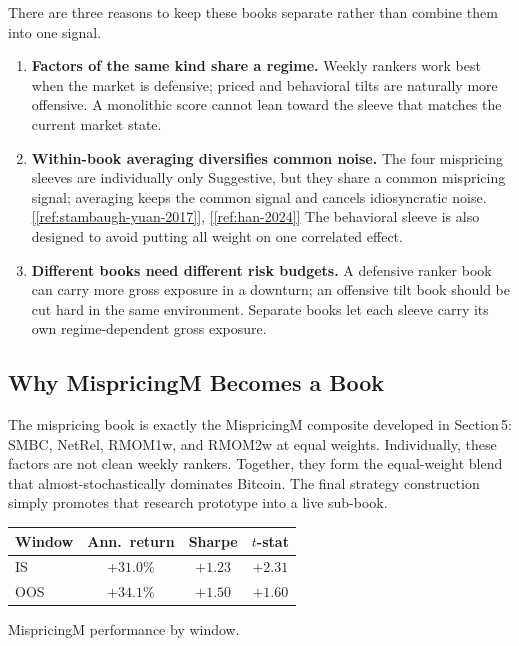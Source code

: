 \documentclass[11pt,a4paper]{article}
\newcommand{\ieeecitetwo}[2]{\hyperref[ref:#1]{[\ref*{ref:#1}]}, \hyperref[ref:#2]{[\ref*{ref:#2}]}}
\begin{document}
There are three reasons to keep these books separate rather than combine them into one signal.

\begin{enumerate}[nosep]
  \item \textbf{Factors of the same kind share a regime.} Weekly rankers work best when the market is defensive; priced and behavioral tilts are naturally more offensive. A monolithic score cannot lean toward the sleeve that matches the current market state.
  \item \textbf{Within-book averaging diversifies common noise.} The four mispricing sleeves are individually only Suggestive, but they share a common mispricing signal; averaging keeps the common signal and cancels idiosyncratic noise.\ieeecitetwo{stambaugh-yuan-2017}{han-2024} The behavioral sleeve is also designed to avoid putting all weight on one correlated effect.
  \item \textbf{Different books need different risk budgets.} A defensive ranker book can carry more gross exposure in a downturn; an offensive tilt book should be cut hard in the same environment. Separate books let each sleeve carry its own regime-dependent gross exposure.
\end{enumerate}

\subsection{Why MispricingM Becomes a Book}

The mispricing book is exactly the MispricingM composite developed in Section\,5: SMBC, NetRel, RMOM1w, and RMOM2w at equal weights. Individually, these factors are not clean weekly rankers. Together, they form the equal-weight blend that almost-stochastically dominates Bitcoin. The final strategy construction simply promotes that research prototype into a live sub-book.

\begin{center}
\small
\begin{tabular}{lccc}
\toprule
\rowcolor{tablehead}
\textbf{Window} & \textbf{Ann.\ return} & \textbf{Sharpe} & \textbf{$t$-stat} \\
\midrule
IS  & $+31.0\%$ & $+1.23$ & $+2.31$ \\
OOS & $+34.1\%$ & $+1.50$ & $+1.60$ \\
\bottomrule
\end{tabular}
\end{center}
\smallskip
{\small MispricingM performance by window.}
\end{document}
